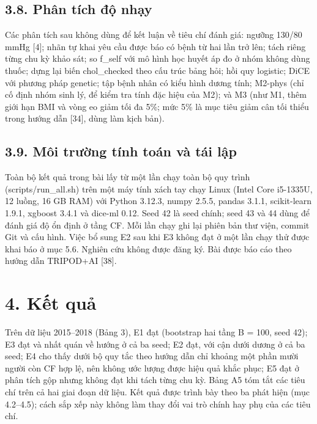 \documentclass[9pt,a4paper]{extarticle}
\begin{document}
\subsection{3.8. Phân tích độ nhạy}

Các phân tích sau không dùng để kết luận về tiêu chí đánh giá: ngưỡng
130/80 mmHg {[}4{]}; nhãn tự khai yêu cầu được báo có bệnh từ hai lần
trở lên; tách riêng từng chu kỳ khảo sát; so f\_self với mô hình học
huyết áp đo ở nhóm không dùng thuốc; dựng lại biến chol\_checked theo
cấu trúc bảng hỏi; hồi quy logistic; DiCE với phương pháp genetic; tập
bệnh nhân có kiểu hình dương tính; M2-phys (chỉ cố định nhóm sinh lý, để
kiểm tra tính đặc hiệu của M2); và M3 (như M1, thêm giới hạn BMI và vòng
eo giảm tối đa 5\%; mức 5\% là mục tiêu giảm cân tối thiểu trong hướng
dẫn {[}34{]}, dùng làm kịch bản).

\subsection{3.9. Môi trường tính toán và tái lập}

Toàn bộ kết quả trong bài lấy từ một lần chạy toàn bộ quy trình
(scripts/run\_all.sh) trên một máy tính xách tay chạy Linux (Intel Core
i5-1335U, 12 luồng, 16 GB RAM) với Python 3.12.3, numpy 2.5.5, pandas
3.1.1, scikit-learn 1.9.1, xgboost 3.4.1 và dice-ml 0.12. Seed 42 là
seed chính; seed 43 và 44 dùng để đánh giá độ ổn định ở tầng CF. Mỗi lần
chạy ghi lại phiên bản thư viện, commit Git và cấu hình. Việc bổ sung E2
sau khi E3 không đạt ở một lần chạy thử được khai báo ở mục 5.6. Nghiên
cứu không được đăng ký. Bài được báo cáo theo hướng dẫn TRIPOD+AI
{[}38{]}.

\section{4. Kết quả}

Trên dữ liệu 2015--2018 (Bảng 3), E1 đạt (bootstrap hai tầng B = 100,
seed 42); E3 đạt và nhất quán về hướng ở cả ba seed; E2 đạt, với cận
dưới dương ở cả ba seed; E4 cho thấy dưới bộ quy tắc theo hướng dẫn chỉ
khoảng một phần mười người còn CF hợp lệ, nên không ước lượng được hiệu
quả khắc phục; E5 đạt ở phân tích gộp nhưng không đạt khi tách từng chu
kỳ. Bảng A5 tóm tắt các tiêu chí trên cả hai giai đoạn dữ liệu. Kết quả
được trình bày theo ba phát hiện (mục 4.2--4.5); cách sắp xếp này không
làm thay đổi vai trò chính hay phụ của các tiêu chí.
\end{document}

